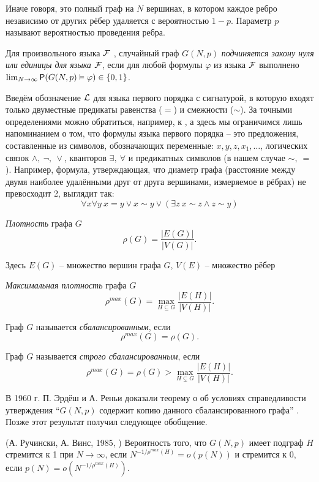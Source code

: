   Иначе говоря, это полный граф на $N$ вершинах, в котором каждое ребро независимо от других рёбер удаляется с вероятностью $1-p$.
  Параметр $p$ называют вероятностью проведения ребра.
    
    \Def Для произвольного языка $\F$ , случайный граф $G(N, p)$ \textit{подчиняется закону нуля или единицы для языка $\F$},
    если для любой формулы $\varphi$ из языка 
    $\F$  выполнено
    $\lim_{N \rightarrow \infty} \P(G(N, p) \vDash \varphi) \in \{0, 1\}$.
    
    Введём обозначение $\LL$ для языка первого порядка с сигнатурой, в которую входят только двуместные предикаты равенства ($=$) и смежности ($\sim$).
    За точными определениями можно обратиться, например, к
    \cite{shen}, а здесь мы ограничимся лишь напоминанием о том, что формулы языка первого порядка -- это предложения, составленные из символов, обозначающих переменные: 
    $x,y,z,x_1,\ldots$, 
    логических связок 
    $\wedge, ~\neg, ~\vee$, 
    кванторов 
    $\exists, ~\forall$ и 
    предикатных символов (в нашем случае
    $\sim, ~ =$).
    Например, формула, утверждающая, что диаметр графа (расстояние между двумя наиболее удалёнными друг от друга вершинами, измеряемое в рёбрах) не превосходит 2, выглядит так:
    \[
    \forall x \forall y ~ x=y \vee x\sim y \vee \left( \exists z ~ x \sim z \wedge z \sim y \right)
    \]
    
    \Def \textit{Плотность} графа $G$ 
   \[ \rho(G) = \frac {|E(G)|}{|V(G)|} .\]
   
   Здесь $E(G)$ -- множество вершин графа $G$, $V(E)$ -- множество рёбер
   
   \Def \textit{Максимальная плотность} графа $G$
     \[ \rho^{max}(G) = \max_{H \subseteq G} \frac {|E(H)|}{|V(H)|} .\]
    
    \Def Граф $G$ называется \textit{сбалансированным}, если 
    \[ \rho^{max}(G) = \rho(G) .\]
    
    \Def Граф $G$ называется \textit{строго сбалансированным}, если 
    \[\rho^{max}(G) = \rho(G) > \max_{H \subsetneq G} \frac {|E(H)|}{|V(H)|} .\]
     
В 1960 г. П. Эрдёш и А. Реньи
доказали теорему о об условиях справедливости утверждения ``$G(N, p)$ содержит копию данного сбалансированного графа'' \cite{erdHos1976evolution}. 
Позже этот результат получил следующее обобщение.
    
\begin{theorem} (А. Ручински, А. Винс, 1985, \cite{rucinski1985balanced}) 
\label{th:ruchinski}
Вероятность того, что $G(N, p)$ имеет подграф $H$ стремится к 1 при $N \rightarrow \infty$, если $N^{-1/\rho^{max}(H)} = o(p(N))$ и стремится к  0, если $p(N) = o\left(N^{-1/\rho^{max}(H)}\right)$.

\end{theorem}

